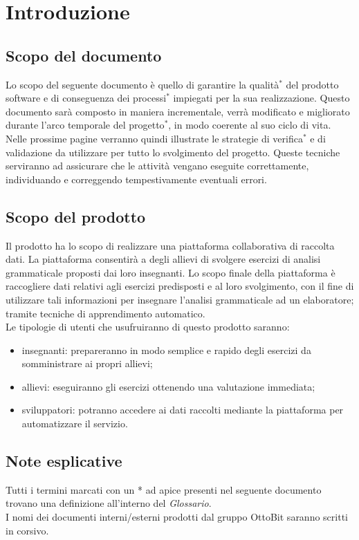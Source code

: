 \section{Introduzione}
\subsection{Scopo del documento}
Lo scopo del seguente documento è quello di garantire la qualità$^*$ del prodotto software e di conseguenza dei processi$^*$ impiegati per la sua realizzazione. Questo documento sarà composto in maniera incrementale, verrà modificato e migliorato durante l'arco temporale del progetto$^*$, in modo coerente al suo ciclo di vita. Nelle prossime pagine verranno quindi illustrate le strategie di verifica$^*$ e di validazione da utilizzare per tutto lo svolgimento del progetto. Queste tecniche serviranno ad assicurare che le attività vengano eseguite correttamente, individuando e correggendo tempestivamente eventuali errori.
\subsection{Scopo del prodotto}
Il prodotto ha lo scopo di realizzare una piattaforma collaborativa di raccolta dati.  La piattaforma consentirà a degli allievi di svolgere esercizi di analisi grammaticale proposti dai loro insegnanti.
Lo scopo finale della piattaforma è raccogliere dati relativi agli esercizi predisposti e al loro svolgimento, con il fine di utilizzare tali informazioni per insegnare l'analisi grammaticale ad un elaboratore; tramite tecniche di apprendimento automatico.\\
Le tipologie di utenti che usufruiranno di questo prodotto saranno:
\begin{itemize}
	\item insegnanti: prepareranno in modo semplice e rapido degli esercizi da somministrare ai propri allievi;
	\item allievi: eseguiranno gli esercizi ottenendo una valutazione immediata;
	\item sviluppatori: potranno accedere ai dati raccolti mediante la piattaforma per automatizzare il servizio.
\end{itemize}
\subsection{Note esplicative}
Tutti i termini marcati con un * ad apice presenti nel seguente documento trovano una definizione all'interno del \textit{Glossario}.\\
I nomi dei documenti interni/esterni prodotti dal gruppo OttoBit saranno scritti in corsivo.
